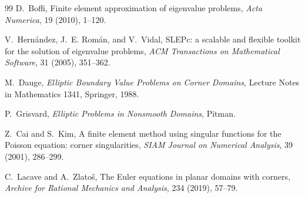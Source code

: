 \documentclass[11pt,a4paper]{article}
\begin{document}
\begin{thebibliography}{99}
D.~Boffi,
\newblock Finite element approximation of eigenvalue problems,
\newblock \emph{Acta Numerica}, 19 (2010), 1--120.

V.~Hern\'andez, J.~E. Rom\'an, and V.~Vidal,
\newblock SLEPc: a scalable and flexible toolkit for the solution of eigenvalue problems,
\newblock \emph{ACM Transactions on Mathematical Software}, 31 (2005), 351--362.

M.~Dauge,
\newblock \emph{Elliptic Boundary Value Problems on Corner Domains},
\newblock Lecture Notes in Mathematics 1341, Springer, 1988.

P.~Grisvard,
\newblock \emph{Elliptic Problems in Nonsmooth Domains},
\newblock Pitman.

Z.~Cai and S.~Kim,
\newblock A finite element method using singular functions for the Poisson equation: corner singularities,
\newblock \emph{SIAM Journal on Numerical Analysis}, 39 (2001), 286--299.

C.~Lacave and A.~Zlato\v{s},
\newblock The Euler equations in planar domains with corners,
\newblock \emph{Archive for Rational Mechanics and Analysis}, 234 (2019), 57--79.

\end{thebibliography}
\end{document}
